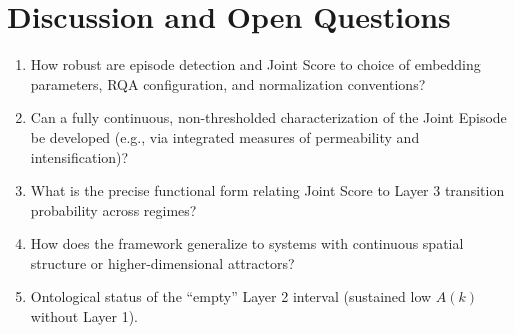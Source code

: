 \section{Discussion and Open Questions}

\begin{enumerate}
    \item How robust are episode detection and Joint Score to choice of embedding parameters, RQA configuration, and normalization conventions?
    \item Can a fully continuous, non-thresholded characterization of the Joint Episode be developed (e.g., via integrated measures of permeability and intensification)?
    \item What is the precise functional form relating Joint Score to Layer 3 transition probability across regimes?
    \item How does the framework generalize to systems with continuous spatial structure or higher-dimensional attractors?
    \item Ontological status of the “empty” Layer 2 interval (sustained low $A(k)$ without Layer 1).
\end{enumerate}
